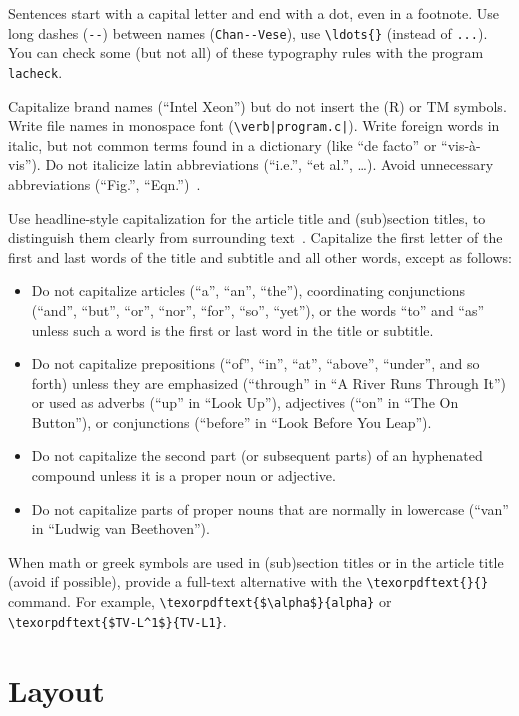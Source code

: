 \documentclass{ipol}
\begin{document}
Sentences start with a capital letter and end with a dot, even in a
footnote. Use long dashes (\verb|--|) between names
(\verb|Chan--Vese|), use \verb|\ldots{}| (instead of \verb|...|).
You can check some (but not all) of these typography rules with the
program \texttt{lacheck}.

Capitalize brand names (``Intel Xeon'') but do not insert the
(R) or TM symbols. Write file names in monospace font
(\verb:\verb|program.c|:). Write foreign words in italic, but not
common terms found in a dictionary (like ``de facto'' or
``vis-\`a-vis''). Do not italicize latin abbreviations (``i.e.'', ``et
al.'', \ldots{}). Avoid unnecessary abbreviations (``Fig.'',
``Eqn.'')~\cite[sec.~26.3.2]{turabian}.

Use headline-style capitalization for the article title and
(sub)section titles, to distinguish them clearly from surrounding
text~\cite[p.~314]{turabian}. Capitalize the first letter of the first
and last words of the title and subtitle and all other words, except
as follows:
\begin{itemize}
\item
  Do not capitalize articles (``a'', ``an'', ``the''), coordinating
  conjunctions (``and'', ``but'', ``or'', ``nor'', ``for'', ``so'',
  ``yet''), or the words ``to'' and ``as'' unless such a word is the
  first or last word in the title or subtitle.
\item
  Do not capitalize prepositions (``of'', ``in'', ``at'', ``above'',
  ``under'', and so forth) unless they are emphasized (``through'' in
  ``A River Runs Through It'') or used as adverbs (``up'' in ``Look
  Up''), adjectives (``on'' in ``The On Button''), or conjunctions
  (``before'' in ``Look Before You Leap'').
\item
  Do not capitalize the second part (or subsequent parts) of an
  hyphenated compound unless it is a proper noun or adjective.
\item
  Do not capitalize parts of proper nouns that are normally in lowercase
  (``van'' in ``Ludwig van Beethoven'').
\end{itemize}

When math or greek symbols are used in (sub)section titles or in the
article title (avoid if possible), provide a full-text alternative
with the \verb|\texorpdftext{}{}| command. For example,
\verb|\texorpdftext{$\alpha$}{alpha}| or
\verb|\texorpdftext{$TV-L^1$}{TV-L1}|.

\section{Layout}
\end{document}
